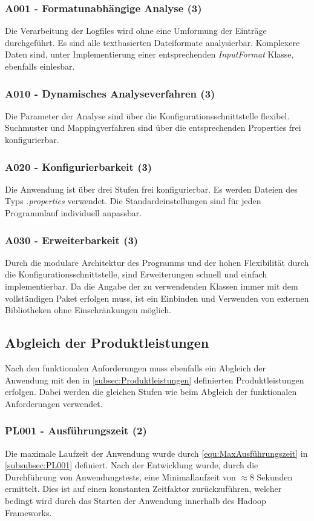 \subsubsection{A001 - Formatunabhängige Analyse (3)}
Die Verarbeitung der Logfiles wird ohne eine Umformung der Einträge durchgeführt. Es sind alle textbasierten Dateiformate analysierbar. Komplexere Daten sind, unter Implementierung einer entsprechenden \textit{InputFormat} Klasse, ebenfalls einlesbar.

\subsubsection{A010 - Dynamisches Analyseverfahren (3)}
Die Parameter der Analyse sind über die Konfigurationsschnittstelle flexibel. Suchmuster und Mappingverfahren sind über die entsprechenden Properties frei konfigurierbar.

\subsubsection{A020 - Konfigurierbarkeit (3)}
Die Anwendung ist über drei Stufen frei konfigurierbar. Es werden Dateien des Typs \textit{.properties} verwendet. Die Standardeinstellungen sind für jeden Programmlauf individuell anpassbar.

\subsubsection{A030 - Erweiterbarkeit (3)}
Durch die modulare Architektur des Programms und der hohen Flexibilität durch die Konfigurationsschnittstelle, sind Erweiterungen schnell und einfach implementierbar. Da die Angabe der zu verwendenden Klassen immer mit dem vollständigen Paket erfolgen muss, ist ein Einbinden und Verwenden von externen Bibliotheken ohne Einschränkungen möglich.

\subsection{Abgleich der Produktleistungen}
Nach den funktionalen Anforderungen muss ebenfalls ein Abgleich der Anwendung mit den in \autoref{subsec:Produktleistungen} definierten Produktleistungen erfolgen. Dabei werden die gleichen Stufen wie beim Abgleich der funktionalen Anforderungen verwendet.

\subsubsection{PL001 - Ausführungszeit (2)}
Die maximale Laufzeit der Anwendung wurde durch \autoref{equ:MaxAusführungszeit} in \autoref{subsubsec:PL001} definiert. Nach der Entwicklung wurde, durch die Durchführung von Anwendungstests, eine Minimallaufzeit von $\approx 8$ Sekunden ermittelt. Dies ist auf einen konstanten Zeitfaktor zurückzuführen, welcher bedingt wird durch das Starten der Anwendung innerhalb des Hadoop Frameworks.

